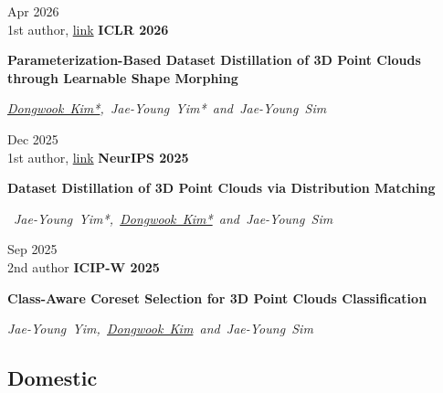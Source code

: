 \documentclass[10pt, letterpaper]{article}
\newenvironment{twocolentry_paper}[2][]{
    \onecolentry
    \def\secondColumn{#2}
    \setcolumnwidth{\fill, 3.1 cm}
    \begin{paracol}{2}
}{
    \switchcolumn \raggedleft \secondColumn
    \end{paracol}
    \endonecolentry
} %
\let\hrefWithoutArrow\href
\renewcommand{\href}[2]{\hrefWithoutArrow{#1}{\ifthenelse{\equal{#2}{}}{ }{#2 }\raisebox{.15ex}{\footnotesize \faExternalLink*}}}
\begin{document}
        \begin{twocolentry_paper}{
            Apr 2026 \\
            1st author, \hrefWithoutArrow{https://openreview.net/forum?id=Qe7dKZOtWM}{\faLink link}
        }
            \textbf{\color{headingOrange}ICLR 2026}

            \textbf{Parameterization-Based Dataset Distillation of 3D Point Clouds through Learnable Shape Morphing}

            \mbox{\textit{\underline{Dongwook Kim*}, Jae-Young Yim*  and Jae-Young Sim}}
            
            \vspace{0.10 cm}
            
        \end{twocolentry_paper}
    
        \begin{twocolentry_paper}{
            Dec 2025
            \\1st author, \hrefWithoutArrow{https://github.com/donguk071/SADM}{\faLink link}
            }
            \textbf{\color{headingOrange}NeurIPS 2025}

            \textbf{Dataset Distillation of 3D Point Clouds via Distribution Matching}

            \mbox{\textit{ Jae-Young Yim*, \underline{Dongwook Kim*} and Jae-Young Sim}}
            \vspace{0.10 cm}
            
        \end{twocolentry_paper}


        \begin{twocolentry_paper}{
            Sep 2025\\
            2nd author
        }
            \textbf{\color{headingOrange}ICIP-W 2025}

            \textbf{Class-Aware Coreset Selection for 3D Point Clouds Classification}

            \mbox{\textit{Jae-Young Yim, \underline{Dongwook Kim}  and Jae-Young Sim}}
            
            \vspace{0.10 cm}
            
        \end{twocolentry_paper}

        \subsection{Domestic}
\end{document}
